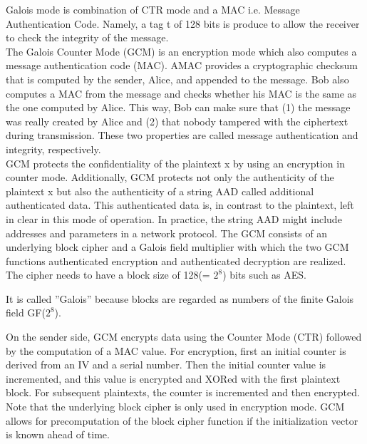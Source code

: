 \documentclass{article}
\begin{document}
Galois mode is combination of CTR mode and a MAC i.e. Message Authentication Code. Namely,
a tag t of 128 bits is produce to allow the receiver to check the integrity of the message.\\

The Galois Counter Mode (GCM) is an encryption mode which also computes a
message authentication code (MAC). AMAC provides a cryptographic checksum
that is computed by the sender, Alice, and appended to the message. Bob also
computes a MAC from the message and checks whether his MAC is the same as
the one computed by Alice. This way, Bob can make sure that (1) the message was
really created by Alice and (2) that nobody tampered with the ciphertext during
transmission. These two properties are called message authentication and integrity,
respectively.\\
GCM protects the confidentiality of the plaintext x by using an encryption in
counter mode. Additionally, GCM protects not only the authenticity of the plaintext
x but also the authenticity of a string AAD called additional authenticated data.
This authenticated data is, in contrast to the plaintext, left in clear in this mode of
operation. In practice, the string AAD might include addresses and parameters in a
network protocol.
The GCM consists of an underlying block cipher and a Galois field multiplier
with which the two GCM functions authenticated encryption and authenticated decryption
are realized. The cipher needs to have a block size of 128(= ${2^8}$) bits such as AES.

It is called ”Galois” because blocks are regarded as numbers of the finite Galois field GF(${2^8}$).

On the sender side, GCM encrypts data using the Counter Mode (CTR) followed by
the computation of a MAC value. For encryption, first an initial counter is derived
from an IV and a serial number. Then the initial counter value is incremented, and
this value is encrypted and XORed with the first plaintext block. For subsequent
plaintexts, the counter is incremented and then encrypted. Note that the underlying
block cipher is only used in encryption mode. GCM allows for precomputation of
the block cipher function if the initialization vector is known ahead of time.\\
\end{document}
